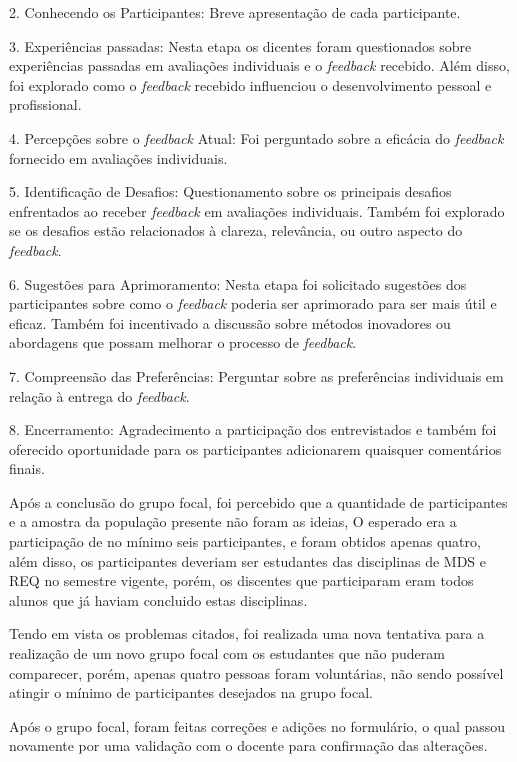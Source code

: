 2. Conhecendo os Participantes: Breve apresentação de cada participante.

3. Experiências passadas: Nesta etapa os dicentes foram questionados sobre experiências passadas em avaliações individuais e o \textit{feedback} recebido. Além disso, foi explorado como o \textit{feedback} recebido influenciou o desenvolvimento pessoal e profissional. 

4. Percepções sobre o \textit{feedback} Atual: Foi perguntado sobre a eficácia do \textit{feedback} fornecido em avaliações individuais. 

5. Identificação de Desafios: Questionamento sobre os principais desafios enfrentados ao receber \textit{feedback} em avaliações individuais. Também foi explorado se os desafios estão relacionados à clareza, relevância, ou outro aspecto do \textit{feedback}. 

6. Sugestões para Aprimoramento: Nesta etapa foi solicitado sugestões dos participantes sobre como o \textit{feedback} poderia ser aprimorado para ser mais útil e eficaz. Também foi incentivado a discussão sobre métodos inovadores ou abordagens que possam melhorar o processo de \textit{feedback}. 

7. Compreensão das Preferências: Perguntar sobre as preferências individuais em relação à entrega do \textit{feedback}.

8. Encerramento: Agradecimento a participação dos entrevistados e também foi oferecido oportunidade para os participantes adicionarem quaisquer comentários finais. 

Após a conclusão do grupo focal, foi percebido que a quantidade de participantes e a amostra da população presente não foram as ideias, O esperado era a participação de no mínimo seis participantes, e foram obtidos apenas quatro, além disso, os participantes deveriam ser estudantes das disciplinas de MDS e REQ no semestre vigente, porém, os discentes que participaram eram todos alunos que já haviam concluido estas disciplinas.

Tendo em vista os problemas citados, foi realizada uma nova tentativa para a realização de um novo grupo focal com os estudantes que não puderam comparecer, porém, apenas quatro pessoas foram voluntárias, não sendo possível atingir o mínimo de participantes desejados na grupo focal.

Após o grupo focal, foram feitas correções e adições no formulário, o qual passou novamente por uma validação com o docente para confirmação das alterações.

